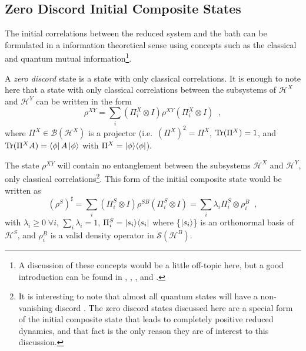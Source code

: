\subsection{Zero Discord Initial Composite States}
The initial correlations between the reduced system and the bath can be formulated in a information theoretical sense using concepts such as the classical and quantum mutual information\footnote{A discussion of these concepts would be a little off-topic here, but a good introduction can be found in \cite{Zurek2003}, \cite{Zurek2002}, \cite{Ollivier2001}, \cite{Rodriguez2010} and \cite{Rodriguez2008A}.}.  
\begin{definition}
A {\em zero discord} state is a state with only classical correlations.  It is enough to note here that a state with only classical correlations between the subsystems of $\mathcal{H}^X$ and $\mathcal{H}^Y$ can be written in the form \cite{Rodriguez2008}
\begin{equation*}
\rho^{XY} = \sum_i \left(\Pi^X_i\otimes I\right) \rho^{XY} \left(\Pi^X_i\otimes I\right)\;\;,
\end{equation*}
where $\Pi^X\in\mathcal{B}(\mathcal{H}^X)$ is a projector (i.e.\ $\left(\Pi^X\right)^2 = \Pi^X$, $\operatorname{Tr}(\Pi^X) = 1$, and $\operatorname{Tr}(\Pi^X A) = \left\langle\phi\right|A\left|\phi\right\rangle$ with $\Pi^X=|\phi\rangle\langle\phi|$).  
\end{definition}
The state $\rho^{XY}$ will contain no entanglement between the subsystems $\mathcal{H}^X$ and $\mathcal{H}^Y$, only classical correlations\footnote{It is interesting to note that almost all quantum states will have a non-vanishing discord \cite{Ferraro2010}.  The zero discord states discussed here are a special form of the initial composite state that leads to completely positive reduced dynamics, and that fact is the only reason they are of interest to this discussion.}.  This form of the initial composite state would be written as \cite{Rodriguez2008}
\begin{equation*}
\left(\rho^{S}\right)^\sharp = \sum_i \left( \Pi^S_i \otimes I\right) \rho^{SB} \left(\Pi^S_i \otimes I \right) = \sum_i \lambda_i \Pi^S_i \otimes \rho^B_i\;\;,
\end{equation*}
with $\lambda_i\ge 0\;\forall i$, $\sum_i \lambda_i = 1$, $\Pi^S_i=|s_i\rangle\langle s_i|$ where \{$\left|s_i\right\rangle$\} is an orthonormal basis of $\mathcal{H}^S$, and $\rho^B_i$ is a valid density operator in $\mathcal{S}(\mathcal{H}^B)$.

